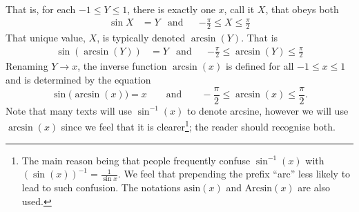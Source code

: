 \begin{eg}
That is, for each $-1\le Y \le 1$, there is exactly one $x$, call it $X$, that obeys both
\begin{align*}
      \sin X &= Y &\text{and} && -\frac{\pi}{2}\le X \le \frac{\pi}{2}
\end{align*}
That unique value, $X$, is typically denoted $\arcsin(Y)$. That is
\begin{align*}
  \sin( \arcsin(Y) ) &= Y & \text{and} && -\frac{\pi}{2}\le \arcsin(Y) \le\frac{\pi}{2}
\end{align*}
Renaming $Y\rightarrow x$, the inverse function $\arcsin(x)$ is
defined for all $-1 \le x \le 1$ and is determined by the
equation
\begin{equation}\label{eq:DIFFarcsin}
\sin\big(\arcsin(x)\big)=x\qquad\text{and}\qquad
        -\frac{\pi}{2}\le \arcsin(x)\le\frac{\pi}{2}.
\end{equation}
Note that many texts will use $\sin^{-1}(x)$ to denote arcsine, however we will use
$\arcsin(x)$ since we feel that it is clearer\footnote{The main reason being that people
frequently confuse $\sin^{-1}(x)$ with $(\sin(x))^{-1} = \frac{1}{\sin x}$. We feel that
prepending the prefix ``arc'' less likely to lead to such confusion. The notations
$\textrm{asin}(x)$ and $\textrm{Arcsin}(x)$ are also used.}; the reader should recognise
both.


\end{eg}


